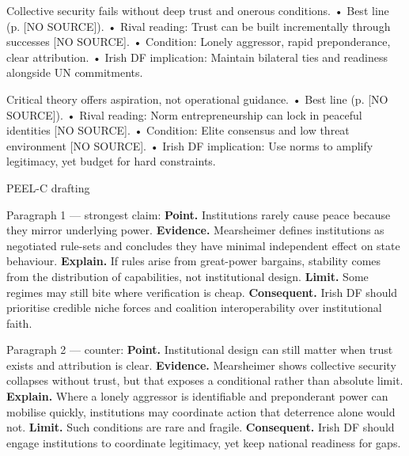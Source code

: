 Collective security fails without deep trust and onerous conditions.
• Best line (p. [NO SOURCE]).
• Rival reading: Trust can be built incrementally through successes [NO SOURCE].
• Condition: Lonely aggressor, rapid preponderance, clear attribution.
• Irish DF implication: Maintain bilateral ties and readiness alongside UN commitments.

Critical theory offers aspiration, not operational guidance.
• Best line (p. [NO SOURCE]).
• Rival reading: Norm entrepreneurship can lock in peaceful identities [NO SOURCE].
• Condition: Elite consensus and low threat environment [NO SOURCE].
• Irish DF implication: Use norms to amplify legitimacy, yet budget for hard constraints.

PEEL-C drafting

Paragraph 1 — strongest claim:
\textbf{Point.} Institutions rarely cause peace because they mirror underlying power. \textbf{Evidence.} Mearsheimer defines institutions as negotiated rule-sets and concludes they have minimal independent effect on state behaviour. \textbf{Explain.} If rules arise from great-power bargains, stability comes from the distribution of capabilities, not institutional design. \textbf{Limit.} Some regimes may still bite where verification is cheap. \textbf{Consequent.} Irish DF should prioritise credible niche forces and coalition interoperability over institutional faith.

Paragraph 2 — counter:
\textbf{Point.} Institutional design can still matter when trust exists and attribution is clear. \textbf{Evidence.} Mearsheimer shows collective security collapses without trust, but that exposes a conditional rather than absolute limit. \textbf{Explain.} Where a lonely aggressor is identifiable and preponderant power can mobilise quickly, institutions may coordinate action that deterrence alone would not. \textbf{Limit.} Such conditions are rare and fragile. \textbf{Consequent.} Irish DF should engage institutions to coordinate legitimacy, yet keep national readiness for gaps.

